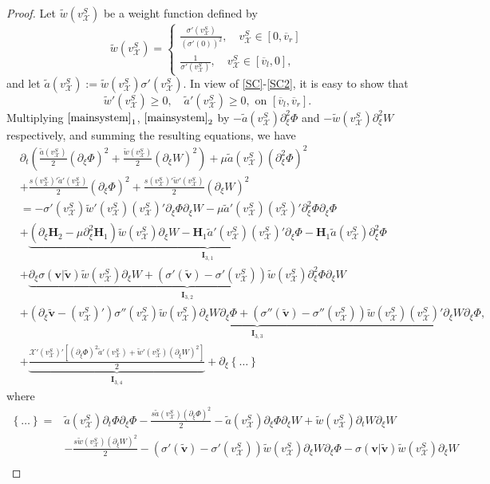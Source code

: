 \documentclass[12pt,reqno]{amsart}
\numberwithin{equation}{section}
\newcommand{\subeqref}[2]{$ \eqref{#1}_{#2} $}
\def\p{\partial}
\def\at{\tilde{a}}
\def\wt{\tilde{w}}
\def\vsx{v^S_{\mathcal{X}}}
\def\avl{\overline{v}_l}
\def\avr{\overline{v}_r}
\def\X{\mathcal{X}}
\begin{document}
\begin{proof}
	Let $\tilde{w}(\vsx)$ be a weight function defined by
	\begin{equation}\label{newweight}
		\tilde{w}(\vsx)=
		\begin{cases}
			\frac{\sigma'(\vsx)}{(\sigma'(0))^2},\quad \vsx \in [0,\avr]\\
			\frac{1}{\sigma'(\vsx)},\quad \vsx \in [\avl,0],
		\end{cases}
	\end{equation}
and let $\at(\vsx):=\wt(\vsx)\sigma'(\vsx)$. In view of \eqref{SC}-\eqref{SC2}, it is easy to show that
\begin{equation}
	\tilde{w}'(\vsx) \geq 0,\quad \tilde{a}'(\vsx) \geq 0, \text{ on } [\avl,\avr].
\end{equation}
Multiplying \subeqref{mainsystem}{1}, \subeqref{mainsystem}{2} by $-\at(\vsx)\p^2_{\xi}\Phi$ and $-\wt(\vsx)\p^2_{\xi}W$ respectively, and summing the resulting equations, we have
	\begin{equation}\label{relt2}
		\begin{aligned}
			&\p_t\left(\frac{\at(\vsx)}{2}(\p_{\xi}\Phi)^2+\frac{\wt(\vsx)}{2}(\p_{\xi}W)^2\right)+\mu\at(\vsx)(\p^2_{\xi}\Phi)^2\\
			&+\frac{s(\vsx)'\at'(\vsx)}{2}(\p_{\xi}\Phi)^2+\frac{s(\vsx)'\wt'(\vsx)}{2}(\p_{\xi}W)^2\\
			&=-\sigma'(\vsx)\wt'(\vsx)(\vsx)'\p_{\xi}\Phi\p_{\xi}W-\mu\at'(\vsx)(\vsx)'\p^2_{\xi}\Phi\p_{\xi}\Phi\\
			&+\underbrace{(\p_{\xi}\mathbf{H}_2-\mu\p^2_{\xi}\mathbf{H}_1)\wt(\vsx)\p_{\xi}W-\mathbf{H}_1\at'(\vsx)(\vsx)'\p_{\xi}\Phi-\mathbf{H}_1\at(\vsx)\p^2_{\xi}\Phi}_{\mathbf{I}_{3,1}}\\
			&+\underbrace{\p_{\xi}\sigma(\mathbf{v}|\mathbf{\tilde{v}})\wt(\vsx)\p_{\xi}W+(\sigma'(\mathbf{\tilde{v}})-\sigma'(\vsx))\wt(\vsx)\p^2_{\xi}\Phi\p_{\xi}W}_{\mathbf{I}_{3,2}}\\
			&+\underbrace{(\p_{\xi}\mathbf{\tilde{v}}-(\vsx)')\sigma''(\vsx)\wt(\vsx)\p_{\xi}W \p_{\xi}\Phi+(\sigma''(\mathbf{\tilde{v}})-\sigma''(\vsx))\wt(\vsx)(\vsx)'\p_{\xi}W\p_{\xi}\Phi,}_{\mathbf{I}_{3,3}}\\
			&+\underbrace{\frac{\X'(\vsx)'[(\p_{\xi}\Phi)^2\at'(\vsx)+\wt'(\vsx)(\p_{\xi}W)^2]}{2}}_{\mathbf{I}_{3,4}}+\p_{\xi}\left\{\dots\right\}
		\end{aligned}
	\end{equation}
	where
	\begin{align*}
		\left\{\dots\right\}=&\at(\vsx)\p_t\Phi\p_{\xi}\Phi-\frac{s\at(\vsx)(\p_{\xi}\Phi)^2}{2}-\at(\vsx)\p_{\xi}\Phi\p_{\xi}W+\wt(\vsx)\p_tW\p_{\xi}W\\&-\frac{s\wt(\vsx)(\p_{\xi}W)^2}{2}-(\sigma'(\mathbf{\tilde{v}})-\sigma'(\vsx))\wt(\vsx)\p_{\xi}W\p_{\xi}\Phi-\sigma(\mathbf{v}|\mathbf{\tilde{v}})\wt(\vsx)\p_{\xi}W\\

\end{align*}
\end{proof}
\end{document}
